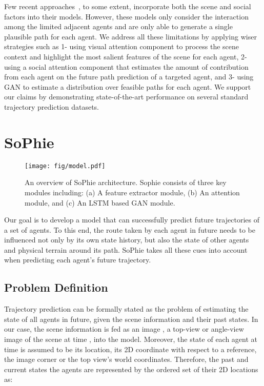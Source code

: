 \documentclass[10pt,twocolumn,letterpaper]{article}
\begin{document}
Few recent approaches~\cite{lee2017desire,xue2018ss,bartoli2017context}, to some extent, incorporate both the scene and social factors into their models. However, these models only consider the interaction among the limited adjacent agents and are only able to generate a single plausible path for each agent. We address all these limitations by applying wiser strategies such as 1- using visual attention component to process the scene context and highlight the most salient features of the scene for each agent, 2- using a social attention component that estimates the amount of contribution from each agent on the future path prediction of a targeted agent, and 3- using GAN to estimate a distribution over feasible paths for each agent. We support our claims by demonstrating state-of-the-art performance on several standard trajectory prediction datasets.


\section{SoPhie}
\label{sec:SoPhie}


\begin{figure*}[ht!]
  \centering
    \texttt{[image: fig/model.pdf]}
\caption{\small An overview of SoPhie architecture. Sophie consists of three key modules including: (a) A feature extractor module, (b) An attention module, and (c) An LSTM based GAN module.}
\label{fig:model}
\end{figure*}


Our goal is to develop a model that can successfully predict future trajectories of a set of agents. To this end, the route taken by each agent in future needs to be influenced not only by its own state history, but also the state of other agents and physical terrain around its path. SoPhie takes all these cues into account when predicting each agent's future trajectory.

\subsection{Problem Definition}
\label{sec:Problem_Definition}
Trajectory prediction can be formally stated as the problem of estimating the state of all agents in future, given the scene information and their past states. In our case, the scene information is fed as an image , \eg a top-view or angle-view image of the scene at time , into the model. Moreover, the state of each agent  at time  is assumed to be its location, \eg its 2D coordinate  with respect to a reference, \eg the image corner or the top view's world coordinates. Therefore, the past and current states the  agents are represented by the ordered set of their 2D locations as: 
\end{document}

